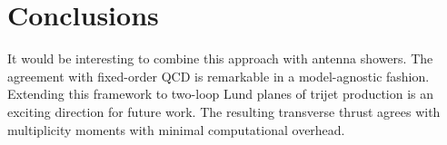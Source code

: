 \section{Conclusions}\label{sec:conclusions}

It would be interesting to combine this approach with antenna showers.
The agreement with fixed-order QCD is remarkable in a model-agnostic
fashion. Extending this framework to two-loop Lund planes of trijet
production is an exciting direction for future work. The resulting
transverse thrust agrees with multiplicity moments with minimal
computational overhead.

